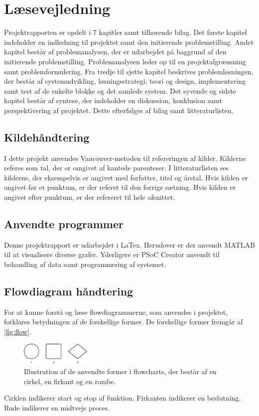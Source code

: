 \section*{Læsevejledning}
Projektrapporten er opdelt i 7 kapitler samt tilhørende bilag. Det første kapitel indeholder en indledning til projektet samt den initierende problemstilling. Andet kapitel består af problemanalysen, der er udarbejdet på baggrund af den initierende problemstilling. Problemanalysen leder op til en projektafgrænsning samt problemformulering. Fra tredje til sjette kapitel beskrives problemløsningen, der består af systemudvikling, løsningsstrategi, teori og design, implementering samt test af de enkelte blokke og det samlede system. Det syvende og sidste kapitel består af syntese, der indeholder en diskussion, konklusion samt perspektivering af projektet. Dette efterfølges af bilag samt litteraturlisten. 


\subsection*{Kildehåndtering}
I dette projekt anvendes Vancouver-metoden til refereringen af kilder. Kilderne referes som tal, der er omgivet af kantede parenteser. I litteraturlisten ses kilderne, der eksempelvis er angivet med forfatter, titel og årstal. Hvis kilden er angivet før et punktum, er der referet til den forrige sætning. Hvis kilden er angivet efter punktum, er der refereret til hele afsnittet.

\subsection*{Anvendte programmer} 
Denne projektrapport er udarbejdet i LaTex. Herudover er der anvendt MATLAB  til at visualisere diverse grafer. Yderligere er PSoC Creator anvendt til behandling af data samt programmering af systemet.  


\subsection*{Flowdiagram håndtering} \label{sec:flowhaandtering}
For at kunne forstå og læse flowdiagrammerne, som anvendes i projektet, forklares betydningen af de forskellige former. De forskellige former fremgår af \autoref{fig:flow}.

\begin{figure}[H]
\centering
\includegraphics[width=0.3\textwidth]{figures/flow}
\caption{Illustration af de anvendte former i flowcharts, der består af en cirkel, en firkant og en rombe.}
\label{fig:flow}
\end{figure}

\noindent
Cirklen indikerer start og stop af funktion. Firkanten indikerer en beslutning. Rude indikerer en midtvejs proces.